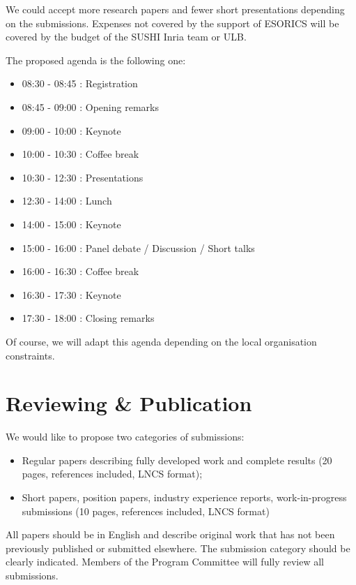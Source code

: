 \documentclass[a4paper,11pt]{article}
\begin{document}
We could accept more research papers and
fewer short presentations depending on the submissions. Expenses not covered by the support of ESORICS
will be covered by the budget of the SUSHI Inria team or ULB.

The proposed agenda is the following one:
%
\begin{itemize}
    \item 08:30 - 08:45 : Registration
    \item 08:45 - 09:00 : Opening remarks
    \item 09:00 - 10:00 : Keynote
    \item 10:00 - 10:30 : Coffee break
    \item 10:30 - 12:30 : Presentations
    \item 12:30 - 14:00 : Lunch
    \item 14:00 - 15:00 : Keynote
    \item 15:00 - 16:00 : Panel debate / Discussion / Short talks
    \item 16:00 - 16:30 : Coffee break
    \item 16:30 - 17:30 : Keynote
    \item 17:30 - 18:00 : Closing remarks
\end{itemize}
%
Of course, we will adapt this agenda depending on the local organisation constraints.


\section{Reviewing \& Publication}
%
We would like to propose two categories of submissions:
%
\begin{itemize}
%
    \item Regular papers describing fully developed work and complete
results (20 pages, references included, LNCS format);
%
    \item Short papers, position papers, industry experience reports,
work-in-progress submissions (10 pages, references included, LNCS format)
%
\end{itemize}

All papers should be in English and describe original work that has not
been previously published or submitted elsewhere. The submission category
should be clearly indicated. Members of the Program Committee will fully review all submissions.
\end{document}
